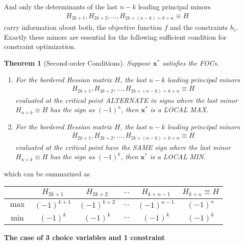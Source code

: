 \documentclass[10pt,a4paper]{book}
\newtheorem{theorem}{Theorem}[section]
\theoremstyle{definition}\newtheorem{definition}{Definition}
\theoremstyle{definition}\newtheorem{fact}{Fact}
\theoremstyle{definition}\newtheorem{ex}{Ex.}
\theoremstyle{definition}\newtheorem{project}{Project}
\theoremstyle{definition}\newtheorem{problem}{Problem}
\theoremstyle{definition}\newtheorem{example}{Example}
\numberwithin{theorem}{chapter}
\numberwithin{corollary}{chapter}
\numberwithin{assumption}{chapter}
\numberwithin{definition}{chapter}
\numberwithin{prop}{chapter}
\numberwithin{notation}{chapter}
\numberwithin{problem}{chapter}
\numberwithin{example}{chapter}
\numberwithin{fact}{chapter}
\numberwithin{ex}{chapter}
\newenvironment{ftheorem}
{\begin{mdframed}\begin{theorem}}
		{\end{theorem}\end{mdframed}}
\def\x{\mathbf x}
\begin{document}
	And only the determinants of the last $n - k$ leading principal minors 
	\begin{align*}
		H_{2k+1}, H_{2k+2}, \dots , H_{2k+(n - k) = k + n} \equiv H 
	\end{align*}
	carry information about both, the objective function $f$ and the constraints $h_i$. Exactly these minors are essential for the following sufficient condition for constraint optimization.
	
	\begin{ftheorem}[Second-order Conditions]
		
		
		Suppose $\x^*$ satisfies the FOCs.
		\begin{enumerate}
			\item For the bordered Hessian matrix $H$, the last $n-k$ leading principal minors 
			\begin{align*}
				H_{2k+1}, H_{2k+2}, \dots , H_{2k+(n - k) = k + n} \equiv H 
			\end{align*}
			evaluated at the critical point ALTERNATE in signs where the last minor $H_{n+k} \equiv H$ has the sign as $(-1)^n$, then $\x^*$ is a LOCAL MAX.
			\item For the bordered Hessian matrix $H$, the last $n-k$ leading principal minors 
			\begin{align*}
				H_{2k+1}, H_{2k+2}, \dots , H_{2k+(n - k) = k + n} \equiv H 
			\end{align*}
			evaluated at the critical point have the SAME sign where the last minor $H_{n+k} \equiv H$ has the sign as $(-1)^k$, then $\x^*$ is a LOCAL MIN.
		\end{enumerate}
	\end{ftheorem}
	which can be summarized as
	\begin{table}[ht]
		\centering
		\begin{tabular}{c | c | c | c | c | c}
			\hline
			& $H_{2k+1}$   & $H_{2k+2}$   & $\dots$ & $H_{k+n-1}$  & $H_{k+n} \equiv H$ \\
			\hline
			$\max$ & $(-1)^{k+1}$ & $(-1)^{k+2}$ & $\dots$ & $(-1)^{n-1}$ & $(-1)^n$           \\
			$\min$ & $(-1)^k$     & $(-1)^k$     & $\dots$ & $(-1)^k$     & $(-1)^k$           \\
			\hline
		\end{tabular}
	\end{table}
	
	\textbf{The case of 3 choice variables and 1 constraint}
	
\end{document}
